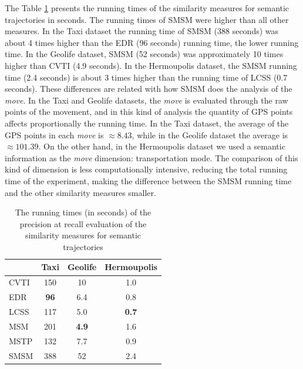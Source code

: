 The Table \ref{tab:running_time_semantic} presents the running times of the similarity measures for semantic trajectories in seconds. The running times of SMSM were higher than all other measures. In the Taxi dataset the running time of SMSM (388 seconds) was about 4 times higher than the EDR (96 seconds) running time, the lower running time. In the Geolife dataset, SMSM (52 seconds) was approximately 10 times higher than CVTI (4.9 seconds). In the Hermoupolis dataset, the SMSM running time (2.4 seconds) is about 3 times higher than the running time of LCSS (0.7 seconds). These differences are related with how SMSM does the analysis of the \emph{move}. In the Taxi and Geolife datasets, the \emph{move} is evaluated through the raw points of the movement, and in this kind of analysis the quantity of GPS points affects proportionally the running time. In the Taxi dataset, the average of the GPS points in each \emph{move} is $\approx 8.43$, while in the Geolife dataset the average is $\approx 101.39$. On the other hand, in the Hermoupolis dataset we used a semantic information as the \emph{move} dimension: transportation mode. The comparison of this kind of dimension is less computationally intensive, reducing the total running time of the experiment, making the difference between the SMSM running time and the other similarity measures smaller. %

\begin{table}[ht!]
  \scriptsize
  \centering
  \begin{tabular}{|l|c|c|c|}
  \hline
& Taxi & Geolife & Hermoupolis\\
  \hline
CVTI & 150 & 10 & 1.0\\
EDR & \textbf{96} & 6.4 & 0.8\\
LCSS & 117 & 5.0 & \textbf{0.7} \\
MSM & 201 & \textbf{4.9} & 1.6\\
MSTP & 132 & 7.7 & 0.9\\
SMSM & 388 & 52 & 2.4\\
    \hline
  \end{tabular}
  \caption{The running times (in seconds) of the precision at recall evaluation of the similarity measures for semantic trajectories}
  \label{tab:running_time_semantic}
\end{table}

